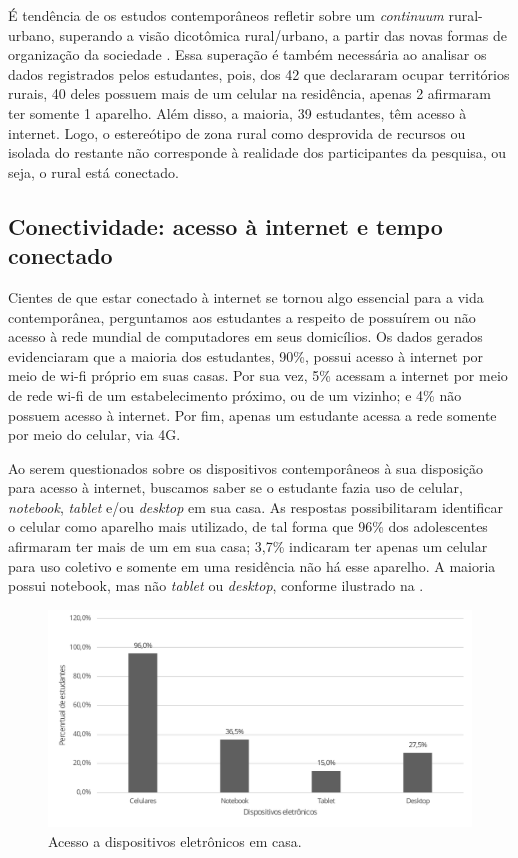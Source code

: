 \documentclass[portuguese]{textolivre}
\begin{document}
É tendência de os estudos contemporâneos refletir sobre um \textit{continuum} rural-urbano, superando a visão dicotômica rural/urbano, a partir das novas formas de organização da sociedade \cite{instituto_brasileiro_de_geografia_e_estatistica_ibge_proposta_2023}. Essa superação é também necessária ao analisar os dados registrados pelos estudantes, pois, dos 42 que declararam ocupar territórios rurais, 40 deles possuem mais de um celular na residência, apenas 2 afirmaram ter somente 1 aparelho. Além disso, a maioria, 39 estudantes, têm acesso à internet. Logo, o estereótipo de zona rural como desprovida de recursos ou isolada do restante não corresponde à realidade dos participantes da pesquisa, ou seja, o rural está conectado.

\subsection{Conectividade: acesso à internet e tempo conectado}\label{sec-fmt-manuscrito}
Cientes de que estar conectado à internet se tornou algo essencial para a vida contemporânea, perguntamos aos estudantes a respeito de possuírem ou não acesso à rede mundial de computadores em seus domicílios. Os dados gerados evidenciaram que a maioria dos estudantes, 90\%, possui acesso à internet por meio de wi-fi próprio em suas casas. Por sua vez, 5\% acessam a internet por meio de rede wi-fi de um estabelecimento próximo, ou de um vizinho; e 4\% não possuem acesso à internet. Por fim, apenas um estudante acessa a rede somente por meio do celular, via 4G.

Ao serem questionados sobre os dispositivos contemporâneos à sua disposição para acesso à internet, buscamos saber se o estudante fazia uso de celular, \textit{notebook}, \textit{tablet} e/ou \textit{desktop} em sua casa. As respostas possibilitaram identificar o celular como aparelho mais utilizado, de tal forma que 96\% dos adolescentes afirmaram ter mais de um em sua casa; 3,7\% indicaram ter apenas um celular para uso coletivo e somente em uma residência não há esse aparelho. A maioria possui notebook, mas não \textit{tablet} ou \textit{desktop}, conforme ilustrado na .

\begin{figure}
\centering
\begin{minipage}{0.85\textwidth}
\includegraphics[width=\linewidth]{Graf1.pdf}
\caption{Acesso a dispositivos eletrônicos em casa.}
\label{fig1}
\end{minipage}
\end{figure}
\end{document}
